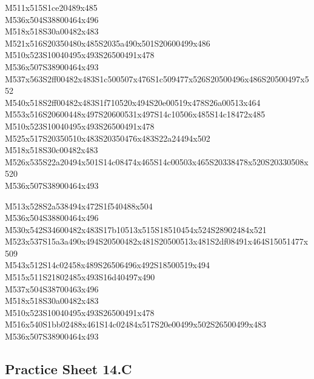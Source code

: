 \documentclass{article}
\begin{document}
\begin{multicols}{5}
\begin{center}
M511x515S1ce20489x485 %
\\M536x504S38800464x496 %
\\M518x518S30a00482x483 %
\\M521x516S20350480x485S2035a490x501S20600499x486 %
\\M510x523S10040495x493S26500491x478 %
\\M536x507S38900464x493 %
\\M537x563S2ff00482x483S1c500507x476S1c509477x526S20500496x486S20500497x552 %
\\M540x518S2ff00482x483S1f710520x494S20e00519x478S26a00513x464 %
\\M553x516S20600448x497S20600531x497S14c10506x485S14c18472x485 %
\\M510x523S10040495x493S26500491x478 %
\\M525x517S20350510x483S20350476x483S22a24494x502 %
\\M518x518S30c00482x483 %
\\M526x535S22a20494x501S14c08474x465S14c00503x465S20338478x520S20330508x520 %
\\M536x507S38900464x493 %
\vfil
\columnbreak

M513x528S2a538494x472S1f540488x504 %
\\M536x504S38800464x496 %
\\M530x542S34600482x483S17b10513x515S18510454x524S28902484x521 %
\\M523x537S15a3a490x494S20500482x481S20500513x481S2df08491x464S15051477x509 %
\\M543x512S14c02458x489S26506496x492S18500519x494 %
\\M515x511S21802485x493S16d40497x490 %
\\M537x504S38700463x496 %
\\M518x518S30a00482x483 %
\\M510x523S10040495x493S26500491x478 %
\\M516x540S1bb02488x461S14c02484x517S20e00499x502S26500499x483 %
\\M536x507S38900464x493 %
\vfil

\end{center}
\end{multicols}

\subsection{Practice Sheet 14.C}
\end{document}
